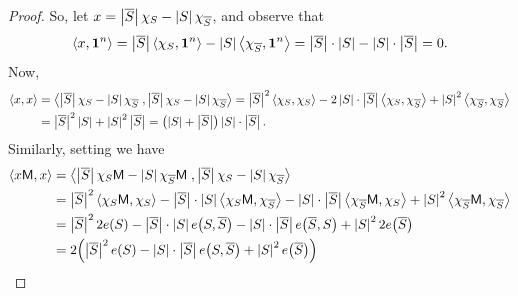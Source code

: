 {\begin{proof}
    So, let $x = \left| {\overline{S}} \right|\chi_{S} -
    \left| {S} \right|\chi_{\overline{S}}$, and observe that 
    \[
    \left\langle {{x},{\mathbf{1}^{n} }} \right\rangle =
    \left| {\overline{S}} \right|\left\langle {{\ensuremath{\chi_{S}}},{\mathbf{1}^{n}}} \right\rangle -
    \left| {S} \right|\left\langle {{\ensuremath{\chi_{\overline{S}}}},{\mathbf{1}^{n}}} \right\rangle =
    \left| {\overline{S}} \right|\cdot\left| {S} \right| -
    \left| {S} \right|\cdot\left| {\overline{S}} \right| = 0.
    \]
    Now,
    \begin{align*}
        \DotProd{x}{x}
        &=%
        \DotProd{\cardin{\overline{S}}\ChartX{S} -
           \cardin{S}\ChartX{\overline{S}}\;}{\cardin{\overline{S}}\ChartX{S}
           - \cardin{S}\ChartX{\overline{S}}} =%
        \cardin{\overline{S}}^2 \DotProd{\ChartX{S}}{\ChartX{S}} - 2
        \cardin{S}\cdot \cardin{\overline{S}}
        \DotProd{\ChartX{S}}{\ChartX{\overline{S}}} + \cardin{S}^2
        \DotProd{\ChartX{\overline{S}}}{\ChartX{\overline{S}}}\\
        &=%
        \cardin{\overline{S}}^2 \cardin{S} +
        \cardin{S}^2\cardin{\overline{S}} = \pth{ \cardin{S} +
           \cardin{\overline{S}}} \cardin{S} \cdot
        \cardin{\overline{S}} .
    \end{align*}
    Similarly, setting we have
    \begin{align*}
        \DotProd{ x \Mtrx}{x}
        &=%
        \DotProd{\cardin{\overline{S}}\ChartX{S}\Mtrx -
           \cardin{S}\ChartX{\overline{S}}
           \Mtrx\;}{\cardin{\overline{S}}\ChartX{S} -
           \cardin{S}\ChartX{\overline{S}}} \\%
        &=%
        \cardin{\overline{S}}^2 \DotProd{\ChartX{S} \Mtrx}{\ChartX{S}}
        - 
         \cardin{\overline{S}} \cdot \cardin{S}
        \DotProd{\ChartX{S} \Mtrx}{\ChartX{\overline{S}}} 
        - 
        \cardin{S} \cdot \cardin{\overline{S}} 
        \DotProd{\ChartX{\overline{S}} \Mtrx}{\ChartX{S}} 
        + \cardin{S}^2
        \DotProd{\ChartX{\overline{S}}\Mtrx}{\ChartX{\overline{S}}}\\
        &=%
        \cardin{\overline{S}}^2 2e(S)
        - 
         \cardin{\overline{S}} \cdot \cardin{S}
         e\pth{S, \overline{S}}
        - 
        \cardin{S} \cdot \cardin{\overline{S}} 
         e\pth{\overline{S}, S }
        + \cardin{S}^2 2 e \pth{\overline{S}}\\
        &=%
        2 \pth{ 
        \cardin{\overline{S}}^2 e(S)
        - 
        \cardin{S} \cdot \cardin{\overline{S}} 
         e\pth{S,\overline{S} }
        + \cardin{S}^2  e \pth{\overline{S}}
}
\end{align*}
\end{proof}}
